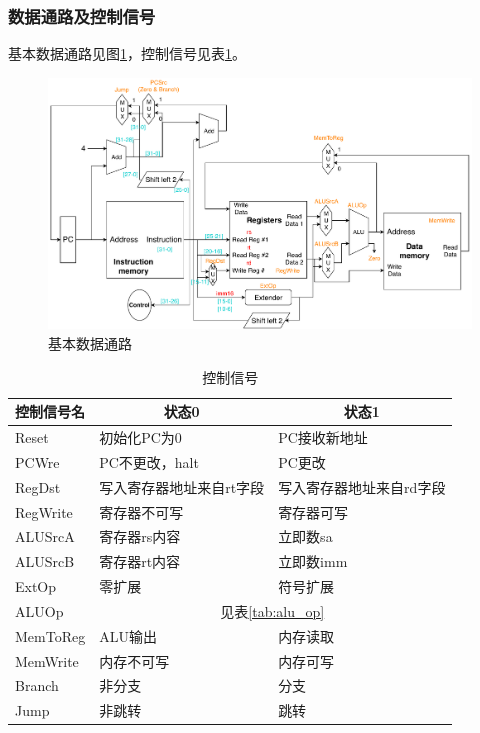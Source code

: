 \subsubsection{数据通路及控制信号}
\qquad 基本数据通路见图\ref{fig:datapath}，控制信号见表\ref{tab:control}。
\begin{figure}[H]
\centering
\includegraphics[width=\linewidth]{fig/Datapath.pdf}
\caption{基本数据通路}
\label{fig:datapath}
\end{figure}
\begin{table}[H]
  \centering\xiaowu
  \caption{控制信号}
    \begin{tabular}{|l|l|l|}
    \hline
    \multicolumn{1}{|c|}{控制信号名} & \multicolumn{1}{c|}{状态0} & \multicolumn{1}{c|}{状态1} \bigstrut\\
    \hline
    Reset & 初始化PC为0 & PC接收新地址 \bigstrut\\
    \hline
    PCWre & PC不更改，halt & PC更改 \bigstrut\\
    \hline
    RegDst & 写入寄存器地址来自rt字段 & 写入寄存器地址来自rd字段 \bigstrut\\
    \hline
    RegWrite & 寄存器不可写 & 寄存器可写 \bigstrut\\
    \hline
    ALUSrcA & 寄存器rs内容 & 立即数sa \bigstrut\\
    \hline
    ALUSrcB & 寄存器rt内容 & 立即数imm \bigstrut\\
    \hline
    ExtOp & 零扩展   & 符号扩展 \bigstrut\\
    \hline
    ALUOp & \multicolumn{2}{c|}{见表\ref{tab:alu_op}} \bigstrut\\
    \hline
    MemToReg & ALU输出 & 内存读取 \bigstrut\\
    \hline
    MemWrite & 内存不可写 & 内存可写 \bigstrut\\
    \hline
    Branch & 非分支   & 分支 \bigstrut\\
    \hline
    Jump  & 非跳转   & 跳转 \bigstrut\\
    \hline
    \end{tabular}%
  \label{tab:control}%
\end{table}%

